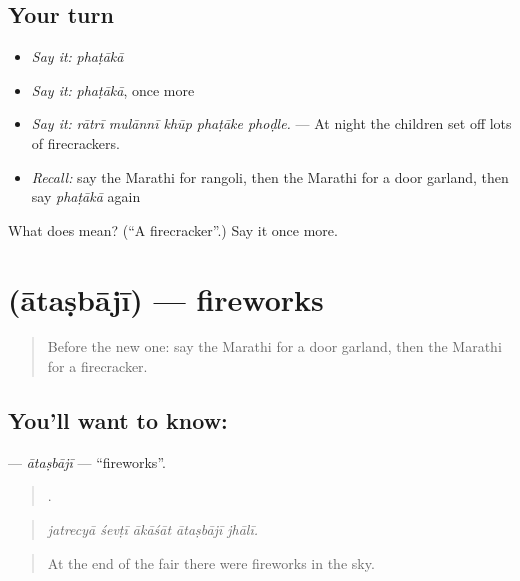 \subsection*{Your turn}
\begin{itemize}
\raggedright
  \item \emph{Say it:} \emph{phaṭākā}
  \item \emph{Say it:} \emph{phaṭākā}, once more
  \item \emph{Say it:} \emph{rātrī mulānnī khūp phaṭāke phoḍle.} — At night the children set off lots of firecrackers.
  \item \emph{Recall:} say the Marathi for rangoli, then the Marathi for a door garland, then say \emph{phaṭākā} again
\end{itemize}

\begin{tcolorbox}[breakable,colback=teal!4,colframe=teal!35!black,title={Before you move on}]
What does  mean? (\textquotedblleft{}A firecracker\textquotedblright{}.) Say it once more.
\end{tcolorbox}
\section[\texorpdfstring{\mr{आतषबाजी} (ātaṣbājī)}{आतषबाजी (ātaṣbājī)}]{ (ātaṣbājī) — fireworks}

\label{lesson:MR-C319-atasbaji}



\begin{quote}
Before the new one: say the Marathi for a door garland, then the Marathi for a firecracker.
\end{quote}

\subsection*{You'll want to know: }
\textbf{} — \emph{ātaṣbājī} — \textquotedblleft{}fireworks\textquotedblright{}.

\begin{quote}
    .
\end{quote}

\begin{quote}
\emph{jatrecyā śevṭī ākāśāt ātaṣbājī jhālī.}
\end{quote}

\begin{quote}
At the end of the fair there were fireworks in the sky.
\end{quote}

